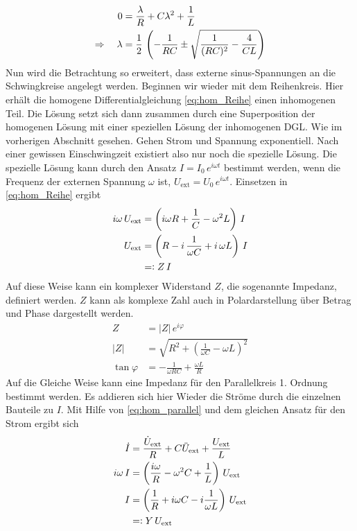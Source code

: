\begin{align*}
    0&=\frac{\lambda}{R}+C\lambda^2+\frac{1}{L}\\
    \Rightarrow\quad\lambda&=\frac{1}{2}\,\left( -\frac{1}{RC}\pm\sqrt{\frac{1}{(RC)^2}-\frac{4}{CL}} \right)
\end{align*}
Nun wird die Betrachtung so erweitert, dass externe sinus-Spannungen an die Schwingkreise angelegt werden. Beginnen wir wieder mit dem Reihenkreis. Hier erhält die homogene Differentialgleichung \eqref{eq:hom_Reihe} einen inhomogenen Teil. Die Lösung setzt sich dann zusammen durch eine Superposition der homogenen Lösung mit einer speziellen Lösung der inhomogenen DGL. Wie im vorherigen Abschnitt gesehen. Gehen Strom und Spannung exponentiell. Nach einer gewissen Einschwingzeit existiert also nur noch die spezielle Lösung. Die spezielle Lösung kann durch den Ansatz $I=I_0\,e^{i\omega t}$ bestimmt werden, wenn die Frequenz der externen Spannung $\omega$ ist, $U_\text{ext}=U_0\,e^{i\omega t}$. Einsetzen in \eqref{eq:hom_Reihe} ergibt
\begin{align*}
    i\omega\,U_\text{ext}&=\left(i\omega R +\frac{1}{C}-\omega^2L\right)\,I\\
    U_\text{ext}&=\left( R-i\,\frac{1}{\omega C}+i\,\omega L \right)\,I\\
    &=\vcentcolon Z\,I
\end{align*}
Auf diese Weise kann ein komplexer Widerstand $Z$, die sogenannte Impedanz, definiert werden. $Z$ kann als komplexe Zahl auch in Polardarstellung über Betrag und Phase dargestellt werden.
\begin{align*}
    Z&=|Z|\,e^{i\varphi}\\
    |Z|&=\sqrt{R^2+\left(\frac{1}{\omega C}-\omega L\right)^2}\\
    \tan\varphi&=-\frac{1}{\omega RC}+\frac{\omega L}{R}
\end{align*}
Auf die Gleiche Weise kann eine Impedanz für den Parallelkreis 1. Ordnung bestimmt werden. Es addieren sich hier Wieder die Ströme durch die einzelnen Bauteile zu $I$. Mit Hilfe von \eqref{eq:hom_parallel} und dem gleichen Ansatz für den Strom ergibt sich
\begin{align*}
    \dot{I}&=\frac{\dot{U}_\text{ext}}{R}+C\ddot{U}_\text{ext}+\frac{U_\text{ext}}{L}\\
    i\omega\,I&=\left( \frac{i\omega}{R}-\omega^2C+\frac{1}{L} \right)\,U_\text{ext}\\
    I&=\left( \frac{1}{R}+i\omega C-i\frac{1}{\omega L} \right)\,U_\text{ext}\\
    &=\vcentcolon Y\,U_\text{ext}
\end{align*}
